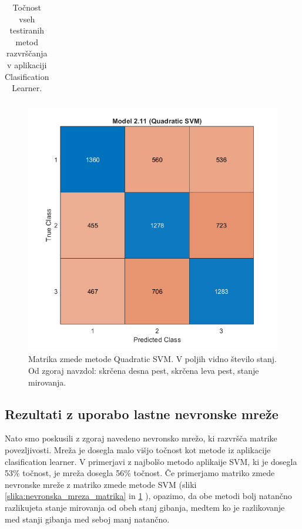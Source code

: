 \begin{table}
\begin{tabular}{|l|l|c|}
\hline
\end{tabular}
\caption{Točnost vseh testiranih metod razvrščanja v aplikaciji Clasification Learner.}
\label{tabela:primerjava_tocnosti}
\end{table}

\begin{figure}
    \begin{center}
    \includegraphics[width=0.8\linewidth]{slike/ConfusionSVM.png}
    \end{center}
    \caption{Matrika zmede metode Quadratic SVM. V poljih vidno število stanj. Od zgoraj navzdol: skrčena desna pest, skrčena leva pest, stanje mirovanja.}
    \label{slika:SVM_matrika}
    \end{figure}

\subsection{Rezultati z uporabo lastne nevronske mreže}
Nato smo poskusili z zgoraj navedeno nevronsko mrežo, ki razvršča matrike povezljivosti. Mreža je dosegla malo višjo točnost kot metode iz aplikacije clasification learner. V primerjavi z najbolšo metodo aplikaije SVM, ki je dosegla 53\% točnost, je mreža dosegla 56\% točnost. Če primerjamo matriko zmede nevronske mreže z matriko zmede metode SVM (sliki \ref{slika:nevronska_mreza_matrika} in \ref{slika:SVM_matrika} ), opazimo, da obe metodi bolj natančno razlikujeta stanje mirovanja od obeh stanj gibanja, medtem ko je razlikovanje med stanji gibanja med seboj manj natančno.

